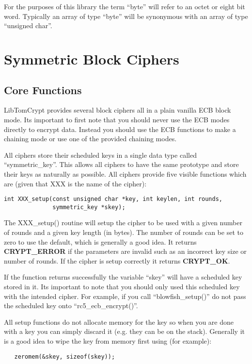 \documentclass{book}
\begin{document}
For the purposes of this library the term ``byte'' will refer to an octet or eight bit word.  Typically an array of
type ``byte'' will be synonymous with an array of type ``unsigned char''.

\chapter{Symmetric Block Ciphers}
\section{Core Functions}

LibTomCrypt provides several block ciphers all in a plain vanilla ECB block mode.  Its important to first note that you 
should never use the ECB modes directly to encrypt data.  Instead you should use the ECB functions to make a chaining mode
or use one of the provided chaining modes.  

All ciphers store their scheduled keys in a single data type called ``symmetric\_key''.  This allows all ciphers to 
have the same prototype and store their keys as  naturally as possible.  All ciphers provide five visible functions which
are (given that XXX is the name of the cipher):
\begin{verbatim}
int XXX_setup(const unsigned char *key, int keylen, int rounds, 
              symmetric_key *skey);
\end{verbatim}

The XXX\_setup() routine will setup the cipher to be used with a given number of rounds and a given key length (in bytes).
The number of rounds can be set to zero to use the default, which is generally a good idea.  It returns 
{\bf CRYPT\_ERROR} if the parameters are invalid such as an incorrect key size or number of rounds.  If the cipher is 
setup correctly it returns {\bf CRYPT\_OK}.

If the function returns successfully the variable ``skey'' will have a scheduled key stored in it.  Its important to note
that you should only used this scheduled key with the intended cipher.  For example, if you call ``blowfish\_setup()'' do not
pass the scheduled key onto ``rc5\_ecb\_encrypt()''.

All setup functions do not allocate memory for the key so when you are done with a key you can simply discard it (e.g. they
can be on the stack).  Generally it is a good idea to wipe the key from memory first using (for example):
\begin{verbatim}
   zeromem(&skey, sizeof(skey));
\end{verbatim}
\end{document}

